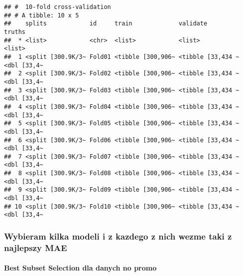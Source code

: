 \documentclass[]{article}
\newenvironment{Shaded}{\begin{snugshade}}{\end{snugshade}}
\newcommand{\DataTypeTok}[1]{\textcolor[rgb]{0.13,0.29,0.53}{#1}}
\newcommand{\DecValTok}[1]{\textcolor[rgb]{0.00,0.00,0.81}{#1}}
\newcommand{\KeywordTok}[1]{\textcolor[rgb]{0.13,0.29,0.53}{\textbf{#1}}}
\newcommand{\NormalTok}[1]{#1}
\newcommand{\OperatorTok}[1]{\textcolor[rgb]{0.81,0.36,0.00}{\textbf{#1}}}
\newcommand{\StringTok}[1]{\textcolor[rgb]{0.31,0.60,0.02}{#1}}
\let\oldparagraph\paragraph
\renewcommand{\paragraph}[1]{\oldparagraph{#1}\mbox{}}
\begin{document}
\begin{Shaded}
\end{Shaded}

\begin{verbatim}
## #  10-fold cross-validation 
## # A tibble: 10 x 5
##    splits            id     train             validate          truths     
##  * <list>            <chr>  <list>            <list>            <list>     
##  1 <split [300.9K/3~ Fold01 <tibble [300,906~ <tibble [33,434 ~ <dbl [33,4~
##  2 <split [300.9K/3~ Fold02 <tibble [300,906~ <tibble [33,434 ~ <dbl [33,4~
##  3 <split [300.9K/3~ Fold03 <tibble [300,906~ <tibble [33,434 ~ <dbl [33,4~
##  4 <split [300.9K/3~ Fold04 <tibble [300,906~ <tibble [33,434 ~ <dbl [33,4~
##  5 <split [300.9K/3~ Fold05 <tibble [300,906~ <tibble [33,434 ~ <dbl [33,4~
##  6 <split [300.9K/3~ Fold06 <tibble [300,906~ <tibble [33,434 ~ <dbl [33,4~
##  7 <split [300.9K/3~ Fold07 <tibble [300,906~ <tibble [33,434 ~ <dbl [33,4~
##  8 <split [300.9K/3~ Fold08 <tibble [300,906~ <tibble [33,434 ~ <dbl [33,4~
##  9 <split [300.9K/3~ Fold09 <tibble [300,906~ <tibble [33,434 ~ <dbl [33,4~
## 10 <split [300.9K/3~ Fold10 <tibble [300,906~ <tibble [33,434 ~ <dbl [33,4~
\end{verbatim}

\hypertarget{wybieram-kilka-modeli-i-z-kazdego-z-nich-wezme-taki-z-najlepszy-mae}{%
\subsubsection{Wybieram kilka modeli i z kazdego z nich wezme taki z
najlepszy
MAE}\label{wybieram-kilka-modeli-i-z-kazdego-z-nich-wezme-taki-z-najlepszy-mae}}

\hypertarget{best-subset-selection-dla-danych-no-promo}{%
\paragraph{Best Subset Selection dla danych no
promo}\label{best-subset-selection-dla-danych-no-promo}}
\end{document}
